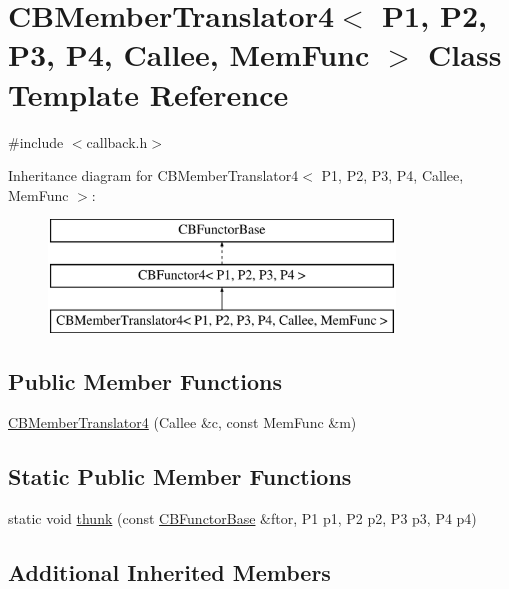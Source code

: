 \hypertarget{class_c_b_member_translator4}{\section{C\+B\+Member\+Translator4$<$ P1, P2, P3, P4, Callee, Mem\+Func $>$ Class Template Reference}
\label{class_c_b_member_translator4}
}


{\ttfamily \#include $<$callback.\+h$>$}

Inheritance diagram for C\+B\+Member\+Translator4$<$ P1, P2, P3, P4, Callee, Mem\+Func $>$\+:\begin{figure}[H]
\begin{center}
\leavevmode
\includegraphics[height=3.000000cm]{class_c_b_member_translator4}
\end{center}
\end{figure}
\subsection*{Public Member Functions}
\begin{DoxyCompactItemize}
\item 
\hyperlink{class_c_b_member_translator4_a5a36e912eb022c5d0b690c4b2b4d2437}{C\+B\+Member\+Translator4} (Callee \&c, const Mem\+Func \&m)
\end{DoxyCompactItemize}
\subsection*{Static Public Member Functions}
\begin{DoxyCompactItemize}
\item 
static void \hyperlink{class_c_b_member_translator4_a6921f84ba578024de5a49ab42d0529ff}{thunk} (const \hyperlink{class_c_b_functor_base}{C\+B\+Functor\+Base} \&ftor, P1 p1, P2 p2, P3 p3, P4 p4)
\end{DoxyCompactItemize}
\subsection*{Additional Inherited Members}



